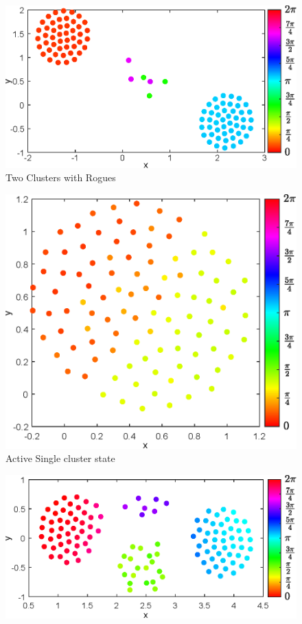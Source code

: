 \documentclass[twocolumn,10pt]{asme2ej}
\begin{document}
{\begin{figure}
    \end{figure}
    \begin{figure}[h!]
        \includegraphics[width = \linewidth]{twoClustersWithR100.eps}
        \caption{Two Clusters with Rogues}
    \end{figure}
    \begin{figure}[h!]
        \includegraphics[width = \linewidth]{ActiveSingle.eps}
        \caption{Active Single cluster state}
    \end{figure}
    \begin{figure}
        \includegraphics[width = \linewidth]{Active4Clust.eps}

\end{figure}}
\end{document}
